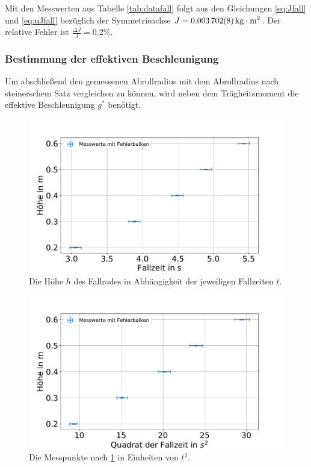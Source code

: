 Mit den Messwerten aus Tabelle \ref{tab:datafall} folgt aus den Gleichungen \ref{eq:Jfall} und \ref{eq:uJfall} bezüglich der Symmetrieachse $J=\SI{0.003702 \pm 0.000008}{kg\cdot m^2}$. Der relative Fehler ist $\frac{\Delta J}{J}=0.2\%$. 








\subsubsection{Bestimmung der effektiven Beschleunigung }
Um abschließend den gemessenen Abrollradius mit dem Abrollradius nach steinerschem Satz vergleichen zu können, wird neben dem Trägheitsmoment die effektive Beschleunigung $g^*$ benötigt.





\begin{figure}[h!]
	\centering
	\includegraphics[width=0.7\linewidth]{auswertung/Fallrad/h,t}
	\caption{Die Höhe $h$ des Fallrades in Abhängigkeit der jeweiligen Fallzeiten $t$.}
	\label{fig:ht}
\end{figure}



\begin{figure}[h!]
	\centering
	\includegraphics[width=0.7\linewidth]{auswertung/Fallrad/h,t^2}
	\caption{Die Messpunkte nach \cref{fig:ht} in Einheiten von $t^2$. }
	\label{fig:ht2}
\end{figure}

